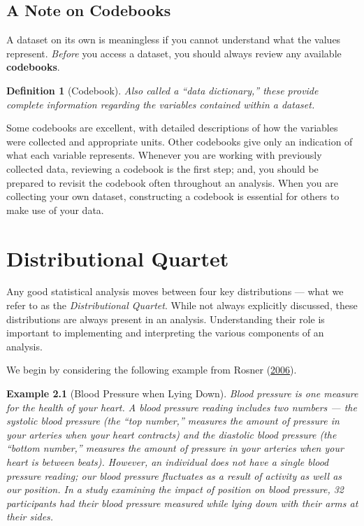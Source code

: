 \documentclass[
]{book}
\theoremstyle{plain}
\theoremstyle{mydefn}
\newtheorem{definition}{Definition}[chapter]
\theoremstyle{myexmpl}
\newtheorem{example}{Example}[chapter]
\theoremstyle{remark}
\begin{document}
\hypertarget{a-note-on-codebooks}{%
\section{A Note on Codebooks}\label{a-note-on-codebooks}}

A dataset on its own is meaningless if you cannot understand what the values represent. \emph{Before} you access a dataset, you should always review any available \textbf{codebooks}.

\begin{definition}[Codebook]
Also called a ``data dictionary,'' these provide complete information regarding the variables contained within a dataset.
\end{definition}

Some codebooks are excellent, with detailed descriptions of how the variables were collected and appropriate units. Other codebooks give only an indication of what each variable represents. Whenever you are working with previously collected data, reviewing a codebook is the first step; and, you should be prepared to revisit the codebook often throughout an analysis. When you are collecting your own dataset, constructing a codebook is essential for others to make use of your data.

\hypertarget{distributional-quartet}{%
\chapter{Distributional Quartet}\label{distributional-quartet}}

Any good statistical analysis moves between four key distributions --- what we refer to as the \emph{Distributional Quartet}. While not always explicitly discussed, these distributions are always present in an analysis. Understanding their role is important to implementing and interpreting the various components of an analysis.

We begin by considering the following example from Rosner (\protect\hyperlink{ref-Rosner2006}{2006}).

\begin{example}[Blood Pressure when Lying Down]
\protect\hypertarget{exm:distributional-quartet-bp}{}\label{exm:distributional-quartet-bp}Blood pressure is one measure for the health of your heart. A blood pressure reading includes two numbers --- the systolic blood pressure (the ``top number,'' measures the amount of pressure in your arteries when your heart contracts) and the diastolic blood pressure (the ``bottom number,'' measures the amount of pressure in your arteries when your heart is between beats). However, an individual does not have a single blood pressure reading; our blood pressure fluctuates as a result of activity as well as our position. In a study examining the impact of position on blood pressure, 32 participants had their blood pressure measured while lying down with their arms at their sides.
\end{example}
\end{document}
